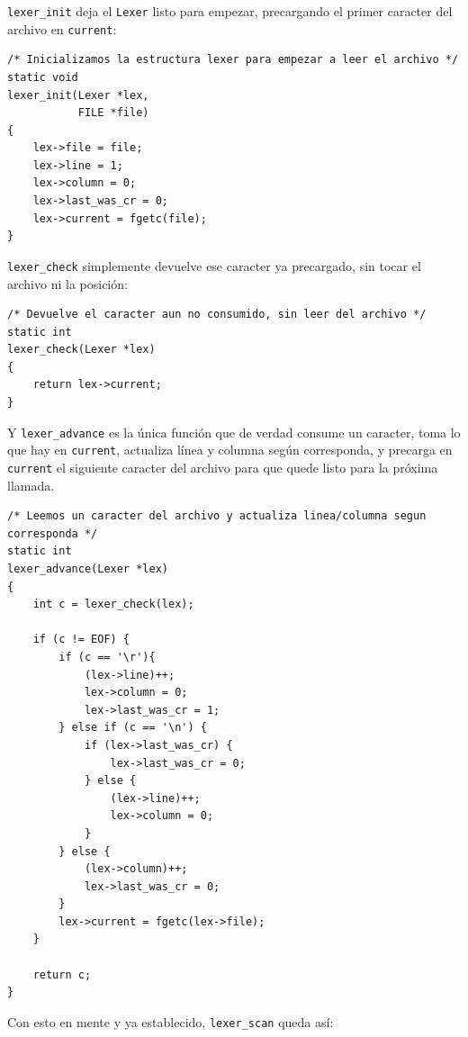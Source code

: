 \documentclass[12pt,letterpaper]{article}
\begin{document}
\texttt{lexer\_init} deja el \texttt{Lexer} listo para empezar, precargando el primer caracter del archivo en
\texttt{current}:

\begin{lstlisting}[style=modernc, caption={Función \texttt{lexer\_init}.}]
/* Inicializamos la estructura lexer para empezar a leer el archivo */
static void
lexer_init(Lexer *lex,
           FILE *file)
{
    lex->file = file;
    lex->line = 1;
    lex->column = 0;
    lex->last_was_cr = 0;
    lex->current = fgetc(file);
}
\end{lstlisting}

\bigskip

\texttt{lexer\_check} simplemente devuelve ese caracter ya precargado, sin tocar el archivo ni la posición:

\begin{lstlisting}[style=modernc, caption={Función \texttt{lexer\_check}.}]
/* Devuelve el caracter aun no consumido, sin leer del archivo */
static int
lexer_check(Lexer *lex)
{
    return lex->current;
}
\end{lstlisting}

\bigskip

Y \texttt{lexer\_advance} es la única función que de verdad consume un caracter, toma lo que hay en
\texttt{current}, actualiza línea y columna según corresponda, y precarga en \texttt{current} el siguiente
caracter del archivo para que quede listo para la próxima llamada.

\begin{lstlisting}[style=modernc, caption={Función \texttt{lexer\_advance}.}]
/* Leemos un caracter del archivo y actualiza linea/columna segun corresponda */
static int
lexer_advance(Lexer *lex)
{
    int c = lexer_check(lex);
    
    if (c != EOF) {
        if (c == '\r'){
            (lex->line)++;
            lex->column = 0;
            lex->last_was_cr = 1;
        } else if (c == '\n') {
            if (lex->last_was_cr) {
                lex->last_was_cr = 0;
            } else {
                (lex->line)++;
                lex->column = 0;
            }
        } else {
            (lex->column)++;
            lex->last_was_cr = 0;
        }
        lex->current = fgetc(lex->file);
    }
    
    return c;
}
\end{lstlisting}
\bigskip

Con esto en mente y ya establecido, \texttt{lexer\_scan} queda así:
\end{document}
